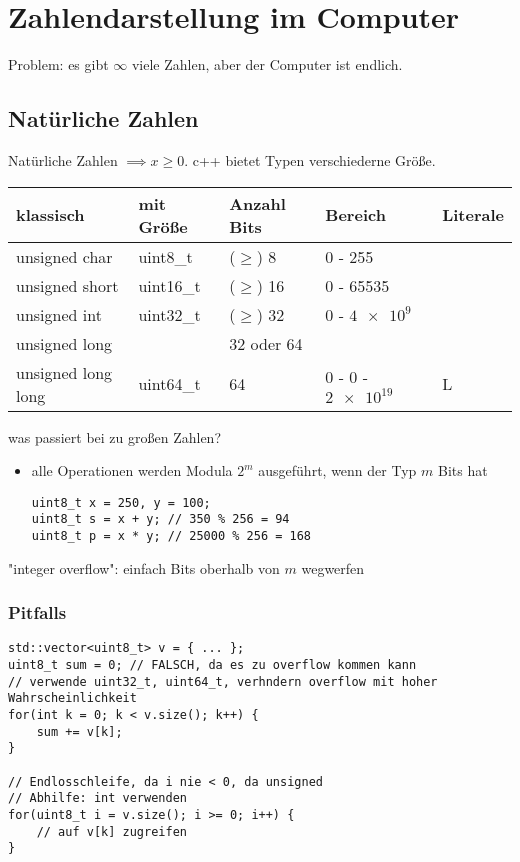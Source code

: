 \documentclass[a4paper]{scrartcl}
\theoremstyle{definition}
\theoremstyle{plain}
\theoremstyle{remark}
\theoremstyle{remark}
\begin{document}
\section{Zahlendarstellung im Computer}
\label{sec-16}
Problem: es gibt $\infty$ viele Zahlen, aber der Computer ist endlich.
\subsection{Natürliche Zahlen}
\label{sec-16-1}
Natürliche Zahlen $\implies x \geq 0$. c++ bietet Typen verschiederne Größe.
\begin{center}
\begin{tabular}{lllll}
klassisch & mit Größe & Anzahl Bits & Bereich & Literale\\
\hline
unsigned char & uint8\_t & ($\geq$) 8 & 0 - 255 & \\
unsigned short & uint16\_t & ($\geq$) 16 & 0 - 65535 & \\
unsigned int & uint32\_t & ($\geq$) 32 & 0 - $\SI{4e9}{}$ & \\
unsigned long &  & 32 oder 64 &  & \\
unsigned long long & uint64\_t & 64 & 0 - 0 -  $\SI{2e19}{}$ & L\\
\end{tabular}
\end{center}
was passiert bei zu großen Zahlen? \\
\begin{itemize}
\item alle Operationen werden Modula $2^m$ ausgeführt, wenn der Typ $m$ Bits hat
\begin{verbatim}
uint8_t x = 250, y = 100;
uint8_t s = x + y; // 350 % 256 = 94
uint8_t p = x * y; // 25000 % 256 = 168
\end{verbatim}
\end{itemize}
"integer overflow": einfach Bits oberhalb von $m$ wegwerfen
\subsubsection{Pitfalls}
\label{sec-16-1-1}
\begin{verbatim}
std::vector<uint8_t> v = { ... };
uint8_t sum = 0; // FALSCH, da es zu overflow kommen kann
// verwende uint32_t, uint64_t, verhndern overflow mit hoher Wahrscheinlichkeit
for(int k = 0; k < v.size(); k++) {
	sum += v[k];
}

// Endlosschleife, da i nie < 0, da unsigned
// Abhilfe: int verwenden
for(uint8_t i = v.size(); i >= 0; i++) {
	// auf v[k] zugreifen
}
\end{verbatim}
\end{document}
